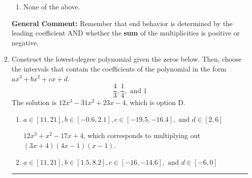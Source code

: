 \documentclass{extbook}[14pt]
\newcommand{\litem}[1]{\item #1

\rule{\textwidth}{0.4pt}}
\begin{document}
\begin{enumerate}
{\begin{enumerate}[label=\Alph*.]
\item None of the above.\end{enumerate}
\textbf{General Comment:} Remember that end behavior is determined by the leading coefficient AND whether the \textbf{sum} of the multiplicities is positive or negative.
}
\litem{
Construct the lowest-degree polynomial given the zeros below. Then, choose the intervals that contain the coefficients of the polynomial in the form $ax^3+bx^2+cx+d$.
\[ \frac{4}{3}, \frac{1}{4}, \text{ and } 1 \]The solution is \( 12x^{3} -31 x^{2} +23 x -4 \), which is option D.\begin{enumerate}[label=\Alph*.]
\item \( a \in [11, 21], b \in [-0.6, 2.1], c \in [-19.5, -16.4], \text{ and } d \in [2, 6] \)

$12x^{3} + x^{2} -17 x + 4$, which corresponds to multiplying out $(3x + 4)(4x -1)(x -1)$.
\item \( a \in [11, 21], b \in [1.5, 8.2], c \in [-16, -14.6], \text{ and } d \in [-6, 0] \)


\end{enumerate}}
\end{enumerate}
\end{document}
